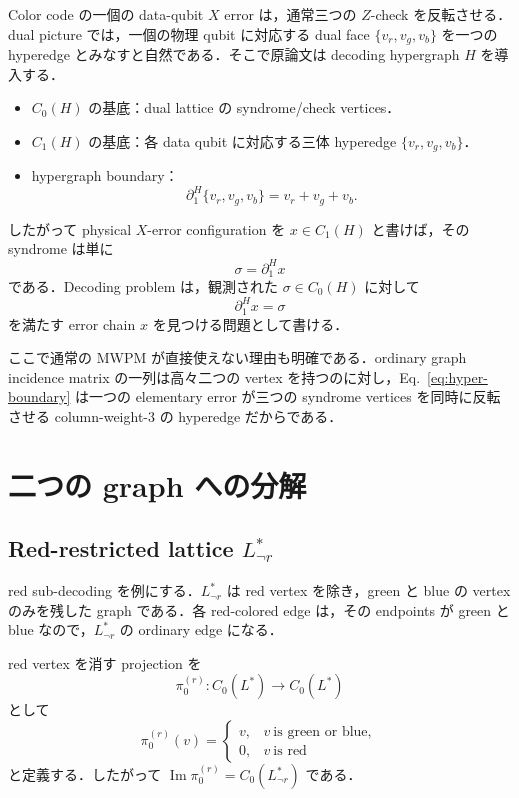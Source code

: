 \documentclass[a4paper,11pt]{ltjsarticle}
\newcommand{\bd}{\partial}
\newcommand{\im}{\operatorname{Im}}
\begin{document}
Color code の一個の data-qubit $X$ error は，通常三つの $Z$-check を反転させる．dual picture では，一個の物理 qubit に対応する dual face $\{v_r,v_g,v_b\}$ を一つの hyperedge とみなすと自然である．そこで原論文は decoding hypergraph $H$ を導入する．

\begin{itemize}
  \item $C_0(H)$ の基底：dual lattice の syndrome/check vertices．
  \item $C_1(H)$ の基底：各 data qubit に対応する三体 hyperedge $\{v_r,v_g,v_b\}$．
  \item hypergraph boundary：
  \begin{equation}
    \bd_1^H\{v_r,v_g,v_b\}=v_r+v_g+v_b.
    \label{eq:hyper-boundary}
  \end{equation}
\end{itemize}

したがって physical $X$-error configuration を $x\in C_1(H)$ と書けば，その syndrome は単に
\begin{equation}
  \sigma=\bd_1^H x
  \label{eq:syndrome-hyper}
\end{equation}
である．Decoding problem は，観測された $\sigma\in C_0(H)$ に対して
\begin{equation}
  \bd_1^H x=\sigma
  \label{eq:decoder-task}
\end{equation}
を満たす error chain $x$ を見つける問題として書ける．

ここで通常の MWPM が直接使えない理由も明確である．ordinary graph incidence matrix の一列は高々二つの vertex を持つのに対し，Eq.~\eqref{eq:hyper-boundary} は一つの elementary error が三つの syndrome vertices を同時に反転させる column-weight-3 の hyperedge だからである．

\section{二つの graph への分解}
\subsection{Red-restricted lattice $L^*_{\neg r}$}

red sub-decoding を例にする．$L^*_{\neg r}$ は red vertex を除き，green と blue の vertex のみを残した graph である．各 red-colored edge は，その endpoints が green と blue なので，$L^*_{\neg r}$ の ordinary edge になる．

red vertex を消す projection を
\begin{equation}
 \pi_0^{(r)}:C_0(L^*)\to C_0(L^*)
\end{equation}
として
\begin{equation}
 \pi_0^{(r)}(v)=
 \begin{cases}
 v,& v\ \text{is green or blue},\\
 0,& v\ \text{is red}
 \end{cases}
 \label{eq:pi-r}
\end{equation}
と定義する．したがって $\im\pi_0^{(r)}=C_0(L^*_{\neg r})$ である．
\end{document}
